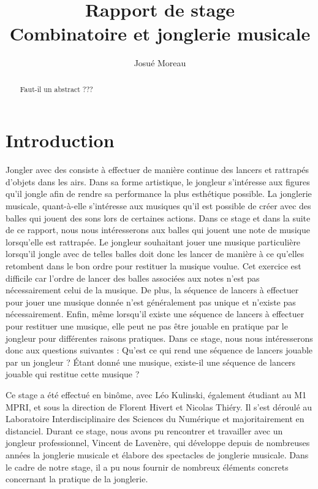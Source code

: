 \documentclass[a4paper]{easychair}
\begin{document}
\title{Rapport de stage\\\large{Combinatoire et jonglerie musicale}}
\titlerunning{}
\author{Josué Moreau}
\authorrunning{}
\institute{}
\maketitle

\begin{abstract}
  Faut-il un abstract ???
\end{abstract}

\section{Introduction}
Jongler avec des consiste à effectuer de manière continue des lancers et
rattrapés d'objets dans les airs. Dans sa forme artistique, le jongleur
s'intéresse aux figures qu'il jongle afin de rendre sa performance la plus
esthétique possible. La jonglerie musicale, quant-à-elle s'intéresse aux
musiques qu'il est possible de créer avec des balles qui jouent des sons lors de
certaines actions. Dans ce stage et dans la suite de ce rapport, nous nous
intéresserons aux balles qui jouent une note de musique lorsqu'elle est
rattrapée. Le jongleur souhaitant jouer une musique particulière lorsqu'il
jongle avec de telles balles doit donc les lancer de manière à ce qu'elles
retombent dans le bon ordre pour restituer la musique voulue. Cet exercice est
difficile car l'ordre de lancer des balles associées aux notes n'est pas
nécessairement celui de la musique. De plus, la séquence de lancers à effectuer
pour jouer une musique donnée n'est généralement pas unique et n'existe pas
nécessairement. Enfin, même lorsqu'il existe une séquence de lancers à effectuer
pour restituer une musique, elle peut ne pas être jouable en pratique par le
jongleur pour différentes raisons pratiques. Dans ce stage, nous nous
intéresserons donc aux questions suivantes : Qu'est ce qui rend une séquence de
lancers jouable par un jongleur ? Étant donné une musique, existe-il une
séquence de lancers jouable qui restitue cette musique ?

Ce stage a été effectué en binôme, avec Léo Kulinski, également étudiant au M1
MPRI, et sous la direction de Florent Hivert et Nicolas Thiéry. Il s'est déroulé
au Laboratoire Interdisciplinaire des Sciences du Numérique et majoritairement
en distanciel. Durant ce stage, nous avons pu rencontrer et travailler avec un
jongleur professionnel, Vincent de Lavenère, qui développe depuis de nombreuses
années la jonglerie musicale et élabore des spectacles de jonglerie musicale.
Dans le cadre de notre stage, il a pu nous fournir de nombreux éléments concrets
concernant la pratique de la jonglerie.
\end{document}
